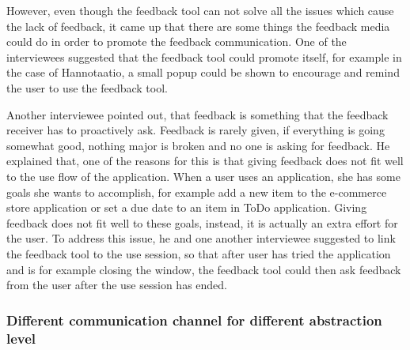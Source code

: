 \documentclass[english,12pt,a4paper,pdftex]{article}
\begin{document}
However, even though the feedback tool can not solve all the issues which cause the lack of feedback, it came up that there are some things the feedback media could do in order to promote the feedback communication. One of the interviewees suggested that the feedback tool could promote itself, for example in the case of Hannotaatio, a small popup could be shown to encourage and remind the user to use the feedback tool. 

Another interviewee pointed out, that feedback is something that the feedback receiver has to proactively ask. Feedback is rarely given, if everything is going somewhat good, nothing major is broken and no one is asking for feedback. He explained that, one of the reasons for this is that giving feedback does not fit well to the use flow of the application. When a user uses an application, she has some goals she wants to accomplish, for example add a new item to the e-commerce store application or set a due date to an item in ToDo application. Giving feedback does not fit well to these goals, instead, it is actually an extra effort for the user. To address this issue, he and one another interviewee suggested to link the feedback tool to the use session, so that after user has tried the application and is for example closing the window, the feedback tool could then ask feedback from the user after the use session has ended.

\subsubsection{Different communication channel for different abstraction level}

\end{document}
